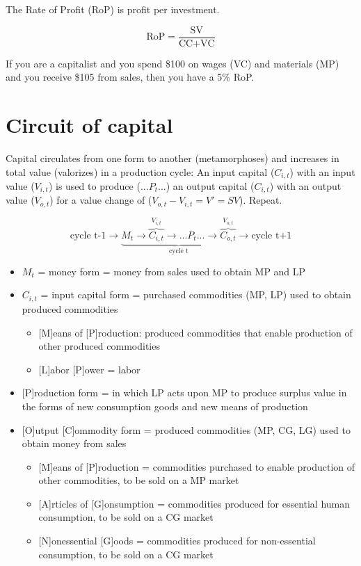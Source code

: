 \documentclass[a4paper]{article}
\begin{document}
The Rate of Profit (RoP) is profit per investment.

\[ \text{RoP} = \frac{\text{SV}}{\text{CC} + \text{VC}} \]

If you are a capitalist and you spend \$100 on wages (VC) and materials (MP) and you receive \$105 from sales, then you have a 5\% RoP.

\section{Circuit of capital}

Capital circulates from one form to another (metamorphoses) and increases in total value (valorizes) in a production cycle: An input capital ($C_{i,t}$) with an input value ($V_{i,t}$) is used to produce ($...P_{t}...$) an output capital ($C_{i,t}$) with an output value ($V_{o,t}$) for a value change of ($V_{o,t}-V_{i,t}=V'=SV$). Repeat.

\[
\text{cycle t-1}
\rightarrow
\underbrace{
	M_{t}
	\rightarrow
	\overbrace{
		C_{i,t}
	}^\text{$V_{i,t}$}
	\rightarrow
	...P_t...
	\rightarrow
	\overbrace{
		C_{o,t}
	}^{V_{o,t}}
}_\text{cycle t}
\rightarrow
\text{cycle t+1} \]

\begin{itemize}
\item {$M_{t}$ = money form = money from sales used to obtain MP and LP}
\item {$C_{i,t}$ = input capital form = purchased commodities (MP, LP) used to obtain produced commodities}
\begin{itemize}
\item {[M]eans of [P]roduction: produced commodities that enable production of other produced commodities}
\item {[L]abor [P]ower = labor}
\end{itemize}
\item {[P]roduction form = in which LP acts upon MP to produce surplus value in the forms of new consumption goods and new means of production}
\item {[O]utput [C]ommodity form = produced commodities (MP, CG, LG) used to obtain money from sales}
\begin{itemize}
\item {[M]eans of [P]roduction = commodities purchased to enable production of other commodities, to be sold on a MP market}
\item {[A]rticles of [G]onsumption = commodities produced for essential human consumption, to be sold on a CG market}
\item {[N]onessential [G]oods = commodities produced for non-essential consumption, to be sold on a CG market}
\end{itemize}
\end{itemize}
\end{document}
